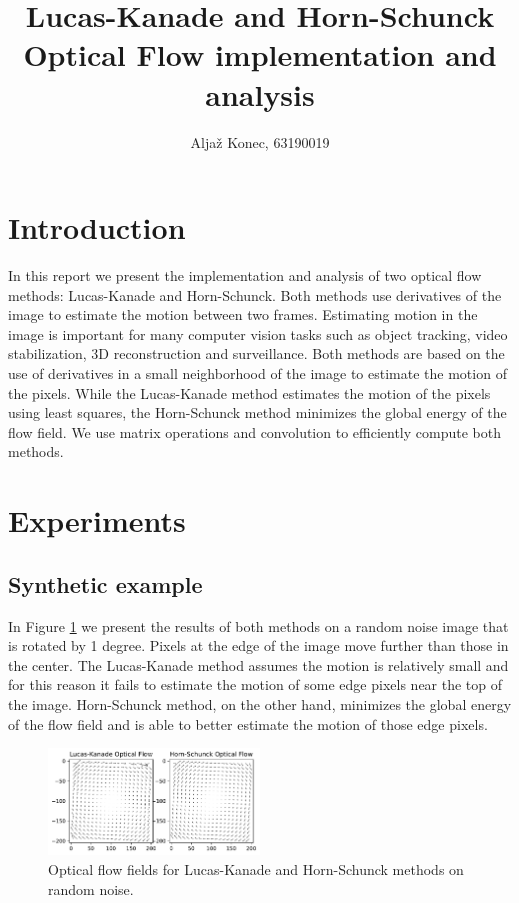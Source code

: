 \documentclass[9pt]{IEEEtran}
\title{\vspace{0ex}
Lucas-Kanade and Horn-Schunck Optical Flow implementation and analysis}
\author{Aljaž Konec, 63190019\vspace{-4.0ex}}
\begin{document}
\maketitle

\section{Introduction}
In this report we present the implementation and analysis of two optical flow methods: Lucas-Kanade and Horn-Schunck.
Both methods use derivatives of the image to estimate the motion between two frames.
Estimating motion in the image is important for many computer vision tasks such as object tracking, video stabilization, 3D reconstruction and surveillance.
Both methods are based on the use of derivatives in a small neighborhood of the image to estimate the motion of the pixels.
While the Lucas-Kanade method estimates the motion of the pixels using least squares, the Horn-Schunck method minimizes the global energy of the flow field.
We use matrix operations and convolution to efficiently compute both methods.

\section{Experiments}

\subsection*{Synthetic example}
In Figure \ref{lk-hs-noise} we present the results of both methods on a random noise image that is rotated by 1 degree.
Pixels at the edge of the image move further than those in the center.
The Lucas-Kanade method assumes the motion is relatively small and for this reason it fails to estimate the motion of some edge pixels near the top of the image.
Horn-Schunck method, on the other hand, minimizes the global energy of the flow field and is able to better estimate the motion of those edge pixels.
\begin{figure}[H]
    \centering
    \includegraphics[width=0.5\textwidth]{LK_HS_noise.pdf}
    \vspace{-20px}
    \caption{Optical flow fields for Lucas-Kanade and Horn-Schunck methods on random noise.}
    \label{lk-hs-noise}
\end{figure}
\end{document}
